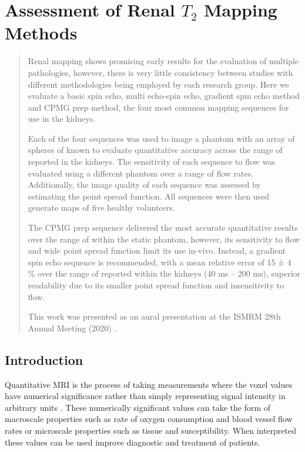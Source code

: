 \chapter{Assessment of Renal $T_2$ Mapping Methods}
\label{chap:t2_mapping}

\begin{abstract}
	Renal \ttwo mapping shows promising early results for the evaluation of multiple pathologies, however, there is very little consistency between studies with different methodologies being employed by each research group. Here we evaluate a basic spin echo, multi echo-spin echo, gradient spin echo method and \ac{CPMG} \ttwo prep method, the four most common \ttwo mapping sequences for use in the kidneys.
	
	Each of the four sequences was used to image a phantom with an array of spheres of known \ttwo to evaluate quantitative accuracy across the range of \ttwo reported in the kidneys. The sensitivity of each sequence to flow was evaluated using a different phantom over a range of flow rates. Additionally, the image quality of each sequence was assessed by estimating the point spread function. All sequences were then used generate \ttwo maps of five healthy volunteers. 
	
	The \ac{CPMG} \ttwo prep sequence delivered the most accurate quantitative results over the range of \ttwo within the static phantom, however, its sensitivity to flow and wide point spread function limit its use in-vivo. Instead, a gradient spin echo sequence is recommended, with a mean relative error of 15 ± 4 \% over the range of \ttwo reported within the kidneys (40 ms – 200 ms), superior readability due to its smaller point spread function and insensitivity to flow.
	
	This work was presented as an aural presentation at the \ac{ISMRM} 28th Annual Meeting (2020) \cite{daniel_comparison_2020}.
	
\end{abstract}
\newpage
\acresetall

\section{Introduction}
\label{sec:t2_intro}
Quantitative \ac{MRI} is the process of taking measurements where the voxel values have numerical significance rather than simply representing signal intensity in arbitrary units \cite{tofts_quantitative_2003}. These numerically significant values can take the form of macroscale properties such as rate of oxygen consumption and blood vessel flow rates or microscale properties such as tissue \tone and susceptibility. When interpreted these values can be used improve diagnostic and treatment of patients.


